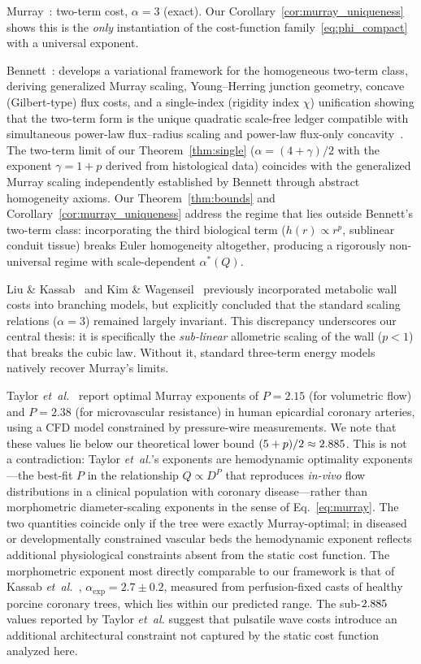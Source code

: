 \documentclass[11pt,a4paper]{article}
\theoremstyle{remark}
\begin{document}
Murray~\cite{Murray1926}: two-term cost, $\alpha=3$ (exact).
Our Corollary~\ref{cor:murray_uniqueness} shows this is the \emph{only}
instantiation
of the cost-function family~\eqref{eq:phi_compact} with a universal exponent.

Bennett~\cite{bennett2025}: develops a variational framework
for the homogeneous two-term class, deriving generalized Murray scaling,
Young--Herring junction geometry, concave (Gilbert-type) flux costs,
and a single-index (rigidity index $\chi$) unification showing that
the two-term form is the unique quadratic scale-free ledger compatible
with simultaneous power-law flux--radius scaling and power-law
flux-only concavity~\cite{bennett2025}.
The two-term limit of our Theorem~\ref{thm:single}
($\alpha = (4{+}\gamma)/2$ with the exponent $\gamma=1+p$ derived from
histological data)
coincides with the generalized Murray scaling independently established
by Bennett through abstract homogeneity axioms.
Our Theorem~\ref{thm:bounds} and Corollary~\ref{cor:murray_uniqueness}
address the regime that lies outside Bennett's two-term class:
incorporating the third biological term ($h(r) \propto r^p$, sublinear
conduit tissue) breaks Euler homogeneity altogether, producing
a rigorously non-universal regime with scale-dependent $\alpha^*(Q)$.

Liu \& Kassab~\cite{LiuKassab2007} and Kim \& Wagenseil~\cite{Kim2015}
previously incorporated metabolic wall costs into branching models, but
explicitly concluded that the standard scaling relations ($\alpha=3$) remained
largely invariant. This discrepancy underscores our central thesis: it is
specifically the \emph{sub-linear} allometric scaling of the wall ($p < 1$) that
breaks the cubic law. Without it, standard three-term energy models natively
recover Murray's limits.

Taylor \textit{et~al.}~\cite{Taylor2022} report optimal Murray exponents of $P =
2.15$ (for volumetric flow) and $P = 2.38$ (for microvascular resistance) in
human epicardial coronary arteries, using a CFD model constrained by
pressure-wire measurements. We note that these values lie below our theoretical
lower bound $(5 + p)/2 \approx 2.885$. This is not a contradiction: Taylor
\textit{et~al.}'s exponents are hemodynamic optimality exponents---the best-fit
$P$ in the relationship $Q \propto D^P$ that reproduces \textit{in-vivo} flow
distributions in a clinical population with coronary disease---rather than
morphometric diameter-scaling exponents in the sense of Eq.~\eqref{eq:murray}.
The two quantities coincide only if the tree were exactly Murray-optimal; in
diseased or developmentally constrained vascular beds the hemodynamic exponent
reflects additional physiological constraints absent from the static cost
function. The morphometric exponent most directly comparable to our framework is
that of Kassab \textit{et~al.}~\cite{Kassab1993}, $\alpha_\mathrm{exp} = 2.7 \pm
0.2$, measured from perfusion-fixed casts of healthy porcine coronary trees,
which lies within our predicted range. The sub-$2.885$ values reported by
Taylor \textit{et~al.} suggest that pulsatile wave costs introduce an additional
architectural constraint not captured by the static cost function analyzed here.
\end{document}
